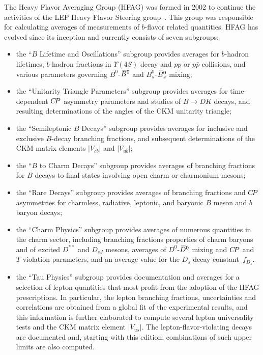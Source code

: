 The Heavy Flavor Averaging Group (HFAG) was formed in 2002 to 
continue the activities of the LEP Heavy Flavor Steering 
group~\cite{Abbaneo:2000ej_mod,*Abbaneo:2001bv_mod_cont}. 
This group was responsible for calculating averages of 
measurements of $b$-flavor related quantities. HFAG has evolved 
since its inception and currently consists of seven subgroups:
% 
\begin{itemize}
\item the ``$B$ Lifetime and Oscillations'' subgroup provides 
averages for $b$-hadron lifetimes, $b$-hadron fractions in 
$\Upsilon(4S)$ decay and $pp$ or $p\bar{p}$ collisions, and various 
parameters governing $B^0$-$\kern 0.18em\overline{\kern -0.18em B}{}^0$ and $B_s^0$-$\kern 0.18em\overline{\kern -0.18em B}{}_s^0$ mixing;

\item the ``Unitarity Triangle Parameters'' subgroup provides
averages for time-dependent $C\!P$ asymmetry parameters and studies of $B \to DK$ decays, and 
resulting determinations of the angles of the CKM unitarity triangle;

\item the ``Semileptonic $B$ Decays'' subgroup provides averages
for inclusive and exclusive $B$-decay branching fractions, and
subsequent determinations of the CKM matrix elements 
$|V_{cb}|$ and $|V_{ub}|$;

\item the ``$B$ to Charm Decays'' subgroup provides averages of 
branching fractions for $B$ decays to final states involving open 
charm or charmonium mesons;

\item the ``Rare Decays'' subgroup provides averages of branching 
fractions and $C\!P$ asymmetries for charmless, radiative, 
leptonic, and baryonic $B$ meson and $b$ baryon decays;

\item the ``Charm Physics'' subgroup provides averages of numerous quantities in the charm sector, including branching fractions 
properties of charm baryons and of excited $D^{**}$ and $D^{}_{sJ}$ mesons, 
averages of $D^0$-$\kern 0.2em\overline{\kern -0.2em D}{}^0$ mixing and $C\!P$ and $T$ violation parameters, 
and an average value for the $D^{}_s$ decay constant~$f^{}_{D_s}$.

\item the ``Tau Physics'' subgroup provides documentation and
averages for a selection of \mtau lepton quantities that most profit
from the adoption of the HFAG prescriptions. In particular, the \mtau
lepton branching fractions, uncertainties and correlations are
obtained from a global fit of the experimental results, and this
information is further elaborated to compute several lepton
universality tests and the CKM matrix element $|V_{us}|$. The \mtau
lepton-flavor-violating decays are documented and, starting with this
edition, combinations of such upper limits are also computed.
\end{itemize}

